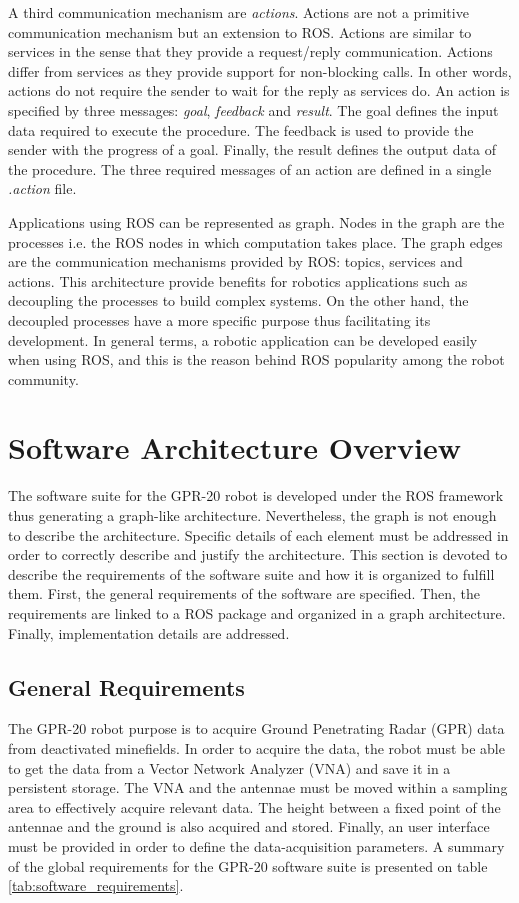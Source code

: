 \documentclass{article}
\begin{document}
A third communication mechanism are \textit{actions}. Actions are not a primitive communication mechanism but an extension to ROS. Actions are similar to services in the sense that they provide a request/reply communication. Actions differ from services as they provide support for non-blocking calls. In other words, actions do not require the sender to wait for the reply as services do. An action is specified by three messages: \textit{goal}, \textit{feedback} and \textit{result}. The goal defines the input data required to execute the procedure. The feedback is used to provide the sender with the progress of a goal. Finally, the result defines the output data of the procedure. The three required messages of an action are defined in a single \textit{.action} file.

Applications using ROS can be represented as graph. Nodes in the graph are the processes i.e. the ROS nodes in which computation takes place. The graph edges are the communication mechanisms provided by ROS: topics, services and actions. This architecture provide benefits for robotics applications such as decoupling the processes to build complex systems. On the other hand, the decoupled processes have a more specific purpose thus facilitating its development. In general terms, a robotic application can be developed easily when using ROS, and this is the reason behind ROS popularity among the robot community.

\newpage
\section{Software Architecture Overview}
The software suite for the GPR-20 robot is developed under the ROS framework thus generating a graph-like architecture. Nevertheless, the graph is not enough to describe the architecture. Specific details of each element must be addressed in order to correctly describe and justify the architecture. This section is devoted to describe the requirements of the software suite and how it is organized to fulfill them. First, the general requirements of the software are specified. Then, the requirements are linked to a ROS package and organized in a graph architecture. Finally, implementation details are addressed.

\subsection{General Requirements}
The GPR-20 robot purpose is to acquire Ground Penetrating Radar (GPR) data from deactivated minefields. In order to acquire the data, the robot must be able to get the data from a Vector Network Analyzer (VNA) and save it in a persistent storage. The VNA and the antennae must be moved within a sampling area to effectively acquire relevant data. The height between a fixed point of the antennae and the ground is also acquired and stored. Finally, an user interface must be provided in order to define the data-acquisition parameters. A summary of the global requirements for the GPR-20 software suite is presented on table \ref{tab:software_requirements}.
\end{document}
